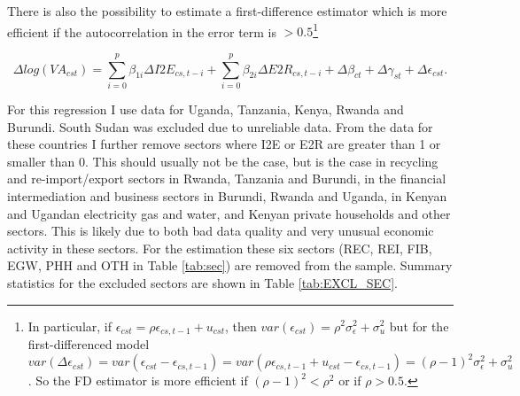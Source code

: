 \documentclass[a4paper]{article}
\begin{document}
 There is also the possibility to estimate a first-difference estimator which is more efficient if the autocorrelation in the error term is $> 0.5$\footnote{In particular, if $\epsilon_{cst} = \rho \epsilon_{cs,t-1} + u_{cst}$, then $var(\epsilon_{cst}) = \rho^2 \sigma^2_\epsilon + \sigma^2_u$ but for the first-differenced model $var(\Delta \epsilon_{cst}) = var(\epsilon_{cst} - \epsilon_{cs,t-1}) = var(\rho \epsilon_{cs,t-1} + u_{cst} - \epsilon_{cs,t-1}) = (\rho-1)^2 \sigma^2_\epsilon + \sigma^2_u$. So the FD estimator is more efficient if $(\rho-1)^2<\rho^2$ or if $\rho > 0.5$. } 

\begin{equation} \label{eq:GROWTH_HDFE}
\Delta log(VA_{cst}) = \sum_{i=0}^p \beta_{1i} \Delta I2E_{cs,t-i} + \sum_{i = 0}^p \beta_{2i} \Delta E2R_{cs,t-i}  + \Delta\beta_{ct} + \Delta\gamma_{st} + \Delta\epsilon_{cst}.
\end{equation}

For this regression I use data for Uganda, Tanzania, Kenya, Rwanda and Burundi. South Sudan was excluded due to unreliable data. From the data for these countries I further remove sectors where I2E or E2R are greater than 1 or smaller than 0. This should usually not be the case, but is the case in recycling and re-import/export sectors in Rwanda, Tanzania and Burundi, in the financial intermediation and business sectors in Burundi, Rwanda and Uganda, in Kenyan and Ugandan electricity gas and water, and Kenyan private households and other sectors. This is likely due to both bad data quality and very unusual economic activity in these sectors. For the estimation these six sectors (REC, REI, FIB, EGW, PHH and OTH in Table \ref{tab:sec}) are removed from the sample. %
Summary statistics for the excluded sectors are shown in Table \ref{tab:EXCL_SEC}.
\end{document}
